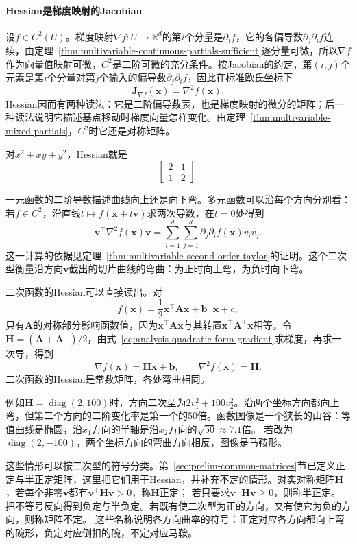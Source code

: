 \paragraph{Hessian是梯度映射的Jacobian}
设$f\in C^2(U)$。梯度映射$\nabla f:U\to\mathbb R^d$的第$i$个分量是$\partial_if$，它的各偏导数$\partial_j\partial_if$连续，由定理~\ref{thm:multivariable-continuous-partials-sufficient}逐分量可微，所以$\nabla f$作为向量值映射可微，$C^2$是二阶可微的充分条件。按Jacobian的约定，第$(i,j)$个元素是第$i$个分量对第$j$个输入的偏导数$\partial_j\partial_if$，因此在标准欧氏坐标下
\begin{equation}
 \bm J_{\nabla f}(\bm x)=\nabla^2f(\bm x).
\label{eq:multivariable-hessian-gradient-jacobian}
\end{equation}
Hessian因而有两种读法：它是二阶偏导数表，也是梯度映射的微分的矩阵；后一种读法说明它描述基点移动时梯度向量怎样变化。由定理~\ref{thm:multivariable-mixed-partials}，$C^2$时它还是对称矩阵。

对$x^2+xy+y^2$，Hessian就是
\[
 \begin{bmatrix}2&1\\1&2\end{bmatrix}.
\]

一元函数的二阶导数描述曲线向上还是向下弯。多元函数可以沿每个方向分别看：若$f\in C^2$，沿直线$t\mapsto f(\bm x+t\bm v)$求两次导数，在$t=0$处得到
\[
 \bm v^\top\nabla^2f(\bm x)\bm v
 =\sum_{i=1}^d\sum_{j=1}^d \partial_j\partial_i f(\bm x)v_i v_j.
\]
这一计算的依据见定理~\ref{thm:multivariable-second-order-taylor}的证明。这个二次型衡量沿方向$\bm v$截出的切片曲线的弯曲：为正时向上弯，为负时向下弯。

二次函数的Hessian可以直接读出。对
\[
 f(\bm{x})=\frac12\bm{x}^{\top}\bm{A}\bm{x}+\bm{b}^{\top}\bm{x}+c,
\]
只有$\bm{A}$的对称部分影响函数值，因为$\bm x^\top\bm A\bm x$与其转置$\bm x^\top\bm A^\top\bm x$相等。令$\bm{H}=(\bm{A}+\bm{A}^{\top})/2$，由式~\eqref{eq:analysis-quadratic-form-gradient}求梯度，再求一次导，得到
\[
 \nabla f(\bm{x})=\bm{H}\bm{x}+\bm{b},\qquad\nabla^2f(\bm{x})=\bm{H}.
\]
二次函数的Hessian是常数矩阵，各处弯曲相同。

例如$\bm H=\operatorname{diag}(2,100)$时，方向二次型为$2v_1^2+100v_2^2$。沿两个坐标方向都向上弯，但第二个方向的二阶变化率是第一个的$50$倍。函数图像是一个狭长的山谷：等值曲线是椭圆，沿$x_1$方向的半轴是沿$x_2$方向的$\sqrt{50}\approx7.1$倍。
若改为$\operatorname{diag}(2,-100)$，两个坐标方向的弯曲方向相反，图像是马鞍形。

这些情形可以按二次型的符号分类。第~\ref{sec:prelim-common-matrices}节已定义正定与半正定矩阵，这里把它们用于Hessian，并补充不定的情形。对实对称矩阵$\bm H$，若每个非零$\bm v$都有$\bm v^\top\bm H\bm v>0$，称$\bm H$正定；
若只要求$\bm v^\top\bm H\bm v\geq0$，则称半正定。
把不等号反向得到负定与半负定。若既有使二次型为正的方向，又有使它为负的方向，则称矩阵不定。
这些名称说明各方向曲率的符号：正定对应各方向都向上弯的碗形，负定对应倒扣的碗，不定对应马鞍。

